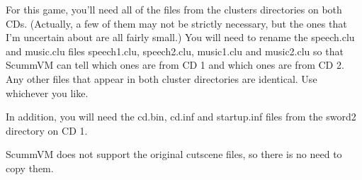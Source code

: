 For this game, you'll need all of the files from the clusters directories on
both CDs. (Actually, a few of them may not be strictly necessary, but the ones
that I'm uncertain about are all fairly small.) You will need to rename the
speech.clu and music.clu files speech1.clu, speech2.clu, music1.clu and
music2.clu so that ScummVM can tell which ones are from CD 1 and which ones are
from CD 2. Any other files that appear in both cluster directories are
identical. Use whichever you like.

In addition, you will need the cd.bin, cd.inf and startup.inf files from the
sword2 directory on CD 1.

ScummVM does not support the original cutscene files, so there is no need to
copy them.


